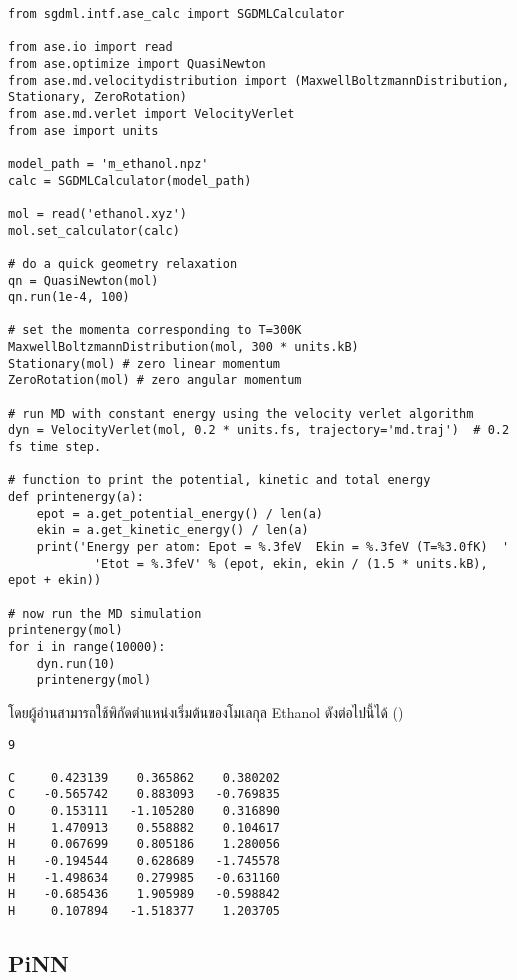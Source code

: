 \begin{lstlisting}[style=MyPython]
from sgdml.intf.ase_calc import SGDMLCalculator

from ase.io import read
from ase.optimize import QuasiNewton
from ase.md.velocitydistribution import (MaxwellBoltzmannDistribution, Stationary, ZeroRotation)
from ase.md.verlet import VelocityVerlet
from ase import units

model_path = 'm_ethanol.npz'
calc = SGDMLCalculator(model_path)

mol = read('ethanol.xyz')
mol.set_calculator(calc)

# do a quick geometry relaxation
qn = QuasiNewton(mol)
qn.run(1e-4, 100)

# set the momenta corresponding to T=300K
MaxwellBoltzmannDistribution(mol, 300 * units.kB)
Stationary(mol) # zero linear momentum
ZeroRotation(mol) # zero angular momentum

# run MD with constant energy using the velocity verlet algorithm
dyn = VelocityVerlet(mol, 0.2 * units.fs, trajectory='md.traj')  # 0.2 fs time step.

# function to print the potential, kinetic and total energy
def printenergy(a):
    epot = a.get_potential_energy() / len(a)
    ekin = a.get_kinetic_energy() / len(a)
    print('Energy per atom: Epot = %.3feV  Ekin = %.3feV (T=%3.0fK)  '
            'Etot = %.3feV' % (epot, ekin, ekin / (1.5 * units.kB), epot + ekin))

# now run the MD simulation
printenergy(mol)
for i in range(10000):
    dyn.run(10)
    printenergy(mol)
\end{lstlisting}

\vspace{1em}
\noindent โดยผู้อ่านสามารถใช้พิกัดตำแหน่งเริ่มต้นของโมเลกุล Ethanol ดังต่อไปนี้ได้ ()

\begin{lstlisting}[style=MyBash]  
9

C 	  0.423139 	  0.365862 	  0.380202
C 	 -0.565742 	  0.883093 	 -0.769835
O 	  0.153111 	 -1.105280 	  0.316890
H 	  1.470913 	  0.558882 	  0.104617
H 	  0.067699 	  0.805186 	  1.280056
H 	 -0.194544 	  0.628689 	 -1.745578
H 	 -1.498634 	  0.279985 	 -0.631160
H 	 -0.685436 	  1.905989 	 -0.598842
H 	  0.107894 	 -1.518377 	  1.203705
\end{lstlisting}

\subsection{PiNN}
\label{ssec:lib_pinn}

